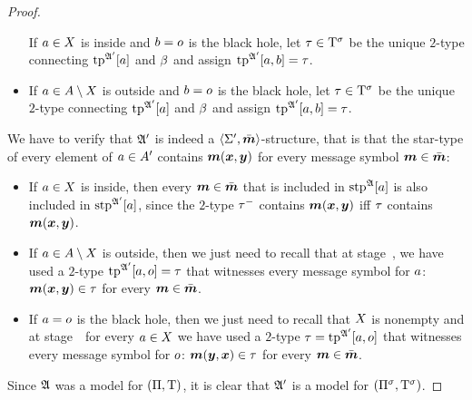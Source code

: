 \begin{proof}
\begin{itemize}
  If $a \in X$ is inside and $b = o$ is the black hole, let $\tau
  \in \mathrm{T}^{\sigma}$ be the unique $2$-type connecting $\operatorname{tp}^{\mathfrak{A'}}[a]$ and
  $\beta$ and assign $\operatorname{tp}^{\mathfrak{A'}}[a,b] = \tau$.
  \item[\refsticondOB]
  If $a \in A\setminus X$ is outside and $b = o$ is the black hole, let
  $\tau \in \mathrm{T}^{\sigma}$ be the unique $2$-type connecting $\operatorname{tp}^{\mathfrak{A'}}[a]$ and
  $\beta$ and assign $\operatorname{tp}^{\mathfrak{A'}}[a,b] = \tau$.
\end{itemize}
We have to verify that $\mathfrak{A'}$ is indeed a $\left\langle \mathrm{\Sigma'},\bar{\bm{m}} \right\rangle$-structure, that
is that the star-type of every element of $a \in A'$ contains
$\bm{m}(\bm{x},\bm{y})$ for every message symbol $\bm{m} \in \bar{\bm{m}}$:
\begin{itemize}
\item[\refsticondI] If $a \in X$ is inside, then every
$\bm{m} \in \bar{\bm{m}}$ that is included in $\operatorname{stp}^{\mathfrak{A}}[a]$ is also included in
$\operatorname{stp}^{\mathfrak{A'}}[a]$, since the $2$-type $\tau^{-}$ contains $\bm{m}(\bm{x},\bm{y})$ iff
$\tau$ contains $\bm{m}(\bm{x},\bm{y})$.
\item[\refsticondO] If $a \in A\setminus X$ is outside, then we just need to
recall that at stage~, we have used a $2$-type $\operatorname{tp}^{\mathfrak{A'}}[a,o]
= \tau$ that witnesses every message symbol for $a$: $\bm{m}(\bm{x},\bm{y}) \in
\tau$ for every $\bm{m} \in \bar{\bm{m}}$.
\item[\refsticondB] If $a = o$ is the black hole, then we just need to
recall that $X$ is nonempty and at stage~~for every $a \in
X$ we have used a $2$-type $\tau = \operatorname{tp}^{\mathfrak{A'}}[a,o]$ that witnesses every
message symbol for $o$: $\bm{m}(\bm{y},\bm{x}) \in \tau$ for every $\bm{m} \in \bar{\bm{m}}$.
\end{itemize}
Since $\mathfrak{A}$ was a model for $(\Pi,\mathrm{T})$, it is clear that $\mathfrak{A'}$ is a
model for $(\Pi^{\sigma},\mathrm{T}^{\sigma})$.
\end{proof}


